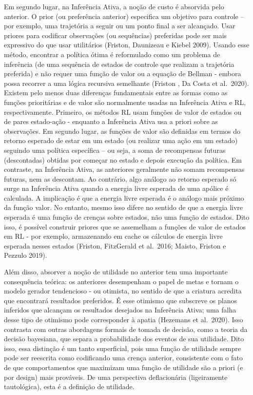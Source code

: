 \documentclass[
  12pt,
]{book}
\begin{document}
Em segundo lugar, na Inferência Ativa, a noção de custo é absorvida pelo anterior. O prior (ou preferência anterior) especifica um objetivo para controle -- por exemplo, uma trajetória a seguir ou um ponto final a ser alcançado. Usar priores para codificar observações (ou sequências) preferidas pode ser mais expressivo do que usar utilitários (Friston, Daunizeau e Kiebel 2009). Usando esse método, encontrar a política ótima é reformulado como um problema de inferência (de uma sequência de estados de controle que realizam a trajetória preferida) e não requer uma função de valor ou a equação de Bellman - embora possa recorrer a uma lógica recursiva semelhante (Friston , Da Costa et al.~2020). Existem pelo menos duas diferenças fundamentais entre as formas como as funções prioritárias e de valor são normalmente usadas na Inferência Ativa e RL, respectivamente. Primeiro, os métodos RL usam funções de valor de estados ou de pares estado-ação - enquanto a Inferência Ativa usa a priori sobre as observações. Em segundo lugar, as funções de valor são definidas em termos do retorno esperado de estar em um estado (ou realizar uma ação em um estado) seguindo uma política específica -- ou seja, a soma de recompensas futuras (descontadas) obtidas por começar no estado e depois execução da política. Em contraste, na Inferência Ativa, as anteriores geralmente não somam recompensas futuras, nem as descontam. Ao contrário, algo análogo ao retorno esperado só surge na Inferência Ativa quando a energia livre esperada de uma apólice é calculada. A implicação é que a energia livre esperada é o análogo mais próximo da função valor. No entanto, mesmo isso difere no sentido de que a energia livre esperada é uma função de crenças sobre estados, não uma função de estados. Dito isso, é possível construir priores que se assemelham a funções de valor de estados em RL - por exemplo, armazenando em cache os cálculos de energia livre esperada nesses estados (Friston, FitzGerald et al.~2016; Maisto, Friston e Pezzulo 2019).

Além disso, absorver a noção de utilidade no anterior tem uma importante consequência teórica: os anteriores desempenham o papel de metas e tornam o modelo gerador tendencioso - ou otimista, no sentido de que a criatura acredita que encontrará resultados preferidos. É esse otimismo que subscreve os planos inferidos que alcançam os resultados desejados na Inferência Ativa; uma falha desse tipo de otimismo pode corresponder à apatia (Hezemans et al.~2020). Isso contrasta com outras abordagens formais de tomada de decisão, como a teoria da decisão bayesiana, que separa a probabilidade dos eventos de sua utilidade. Dito isso, essa distinção é um tanto superficial, pois uma função de utilidade sempre pode ser reescrita como codificando uma crença anterior, consistente com o fato de que comportamentos que maximizam uma função de utilidade são a priori (e por design) mais prováveis. De uma perspectiva deflacionária (ligeiramente tautológica), esta é a definição de utilidade.
\end{document}
